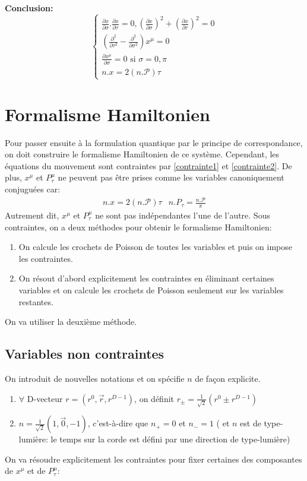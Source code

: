 \documentclass[a4paper,12pt]{article}
\def\xmu{x^\mu}
\def\pt{P_\tau}
\begin{document}
\textbf{Conclusion:}
\begin{equation}
	\left\lbrace
	\begin{aligned}
		\frac{\partial x}{\partial \sigma}.\frac{\partial x}{\partial \tau}=0, \left( \frac{\partial x}{\partial \sigma}\right) ^2+\left( \frac{\partial x}{\partial \tau}\right) ^2=0\\ 
    	\left( \frac{\partial^2}{\partial  \tau^2}-\frac{\partial^2}{\partial  \sigma^2}\right) \xmu=0\\ 
    	\frac{\partial \xmu}{\partial \sigma}=0 \mbox{  si $\sigma=0,\pi$}\\ 
    	n.x=2(n.\mathcal{P})\tau 
	\end{aligned}
    \right.
\end{equation}
\section{Formalisme Hamiltonien}
Pour passer ensuite à la formulation quantique par le principe de correspondance, on doit construire le formalisme Hamiltonien de ce système. Cependant, les équations du mouvement sont contraintes par \eqref{contrainte1} et \eqref{contrainte2}.
De plus, $\xmu$ et $P_\tau^\mu$ ne peuvent pas être prises comme les variables canoniquement conjuguées car:
\begin{align*}
& n.x=2(n.\mathcal{P})\tau & n.P_\tau=\frac{n.\mathcal{P}}{\pi}&
\end{align*}
Autrement dit, $\xmu$ et $\pt^\mu$ ne sont pas indépendantes l'une de l'autre. Sous contraintes, on a deux méthodes pour obtenir le formalisme Hamiltonien:
\begin{enumerate}
\item On calcule les crochets de Poisson de toutes les variables et puis on impose les contraintes.
\item On résout d'abord explicitement les contraintes en éliminant certaines variables et on calcule les crochets de Poisson seulement sur les variables restantes.
\end{enumerate} 
On va utiliser la deuxième méthode.
\subsection{Variables non contraintes}
On introduit de nouvelles notations et on spécifie $n$ de façon explicite.
\begin{enumerate}
\item $\forall$ D-vecteur $r=(r^0,\vec{r},r^{D-1})$, on définit
$r_\pm=\frac{1}{\sqrt2}(r^0\pm r^{D-1})$
\item $n=\frac{1}{\sqrt2}(1,\vec{0},-1)$, c'est-à-dire que 
$n_+=0$ et $n_-=1$ ( et $n$ est de type-lumière: le temps sur la corde est défini par une direction de type-lumière)
\end{enumerate}
On va résoudre explicitement les contraintes pour fixer certaines des composantes de $\xmu$ et de $P_\tau^\mu$: 
\end{document}
